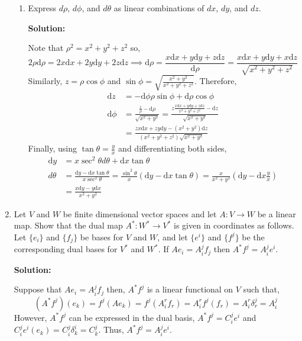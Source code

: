 \documentclass[12pt]{extarticle}
\renewcommand{\d}[1]{\mathrm{d}#1}
\begin{document}
\begin{enumerate}
\begin{enumerate}
\item
Express $d\rho$, $d\phi$, and $d\theta$ as linear combinations of $dx$, $dy$, and $dz$.

\textbf{Solution:}

Note that $\rho^2 = x^2+y^2 + z^2$ so, 
\[2\rho \d{\rho} = 2 x \d{x} + 2 y \d{y} + 2 z \d{z} \implies \d{\rho} = \frac{x \d{x} +  y \d{y} + z \d{z}}{\d{\rho}} = \frac{x \d{x} + y \d{y} + x \d{z}}{\sqrt{x^2 + y^2 + z^2}}\]
Similarly, $z = \rho \cos\phi$ and $\sin{\phi} = \sqrt{\frac{x^2 + y^2}{x^2 + y^2 + z^2}}$. Therefore,
\begin{align*}
\d{z} &= - \d{\phi} \rho \sin{\phi} + \d{\rho} \cos{\phi}
\\
\d{\phi} & = \frac{\frac{z}{\rho} - \d{\rho}}{\sqrt{x^2 + y^2}} = \frac{z \frac{x \d{x} + y \d{y} + z \d{z}}{x^2 + y^2 + z^2} - \d{z}}{\sqrt{x^2 + y^2}}
\\
& = \frac{zx \d{x} + zy \d{y} - (x^2 + y^2) \d{z}}{(x^2 + y^2 + z^2)\sqrt{x^2 + y^2}} 
\end{align*}
Finally, using $\tan{\theta} = \frac{y}{x}$ and differentiating both sides, 
\begin{align*}
\d{y} & = x \sec^2{\theta} d{\theta} + \d{x} \tan{\theta} 
\\
d{\theta} & = \frac{\d{y} - \d{x} \tan{\theta}}{x\sec^2{\theta}} = \frac{\sin^2{\theta}}{x} \left(\d{y} - \d{x} \tan{\theta} \right) = \frac{x}{x^2 + y^2} \left(\d{y} - \d{x} \frac{y}{x} \right)
\\
& = \frac{x \d{y} - y \d{x}}{x^2 + y^2}
\end{align*}

\end{enumerate}

\vfill
\eject

\item Let $V$ and $W$ be finite dimensional vector spaces and let $A:V\to W$ be a linear map. Show that the dual map $A^*:W^*\to V^*$ is given in coordinates as follows. Let $\{e_i\}$ and $\{f_j\}$ be bases for $V$ and $W$, and let $\{e^i\}$ and $\{f^j\}$ be the corresponding dual bases for $V^*$ and $W^*$. 
If $Ae_i=A^j_if_j$ then $A^*f^j=A^j_ie^i$.

\textbf{Solution:}

Suppose that $Ae_i = A^j_i f_j$ then, $A^* f^j$ is a linear functional on $V$ such that, 
\[(A^* f^j) (e_k) = f^j(Ae_k) = f^j(A^r_i f_r) = A^r_i f^j(f_r) = A^r_i \delta^j_r = A^j_i\]
However, $A^* f^j$ can be expressed in the dual basis, $A^* f^j = C^j_i e^i$ and $C^j_i e^i(e_k) = C^j_i \delta^i_k = C^j_k$. Thus, $A^*f^j = A^j_i e^i$.  


\end{enumerate}
\end{document}
